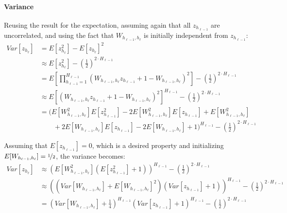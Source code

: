 \paragraph{Variance} Reusing the result for the expectation, assuming again that all $z_{h_{\ell-1}}$ are uncorrelated, and using the fact that $W_{h_{\ell-1},h_\ell}$ is initially independent from $z_{h_{\ell-1}}$:
\begin{equation}
\begin{aligned}
Var[z_{h_\ell}] &= E[z_{h_\ell}^2] - E[z_{h_\ell}]^2 \\
&\approx E[z_{h_\ell}^2] - \left(\frac{1}{2}\right)^{2 \cdot H_{\ell-1}} \\
&= E\left[\prod_{h_{\ell-1}=1}^{H_{\ell-1}}\left(W_{h_{\ell-1},h_\ell} z_{h_{\ell-1}} + 1 - W_{h_{\ell-1},h_\ell}\right)^2\right] - \left(\frac{1}{2}\right)^{2 \cdot H_{\ell-1}} \\
&\approx E[\left(W_{h_{\ell-1},h_\ell} z_{h_{\ell-1}} + 1 - W_{h_{\ell-1},h_\ell}\right)^2]^{H_{\ell-1}}- \left(\frac{1}{2}\right)^{2 \cdot H_{\ell-1}} \\
&= \Big(E[W_{h_{\ell-1},h_\ell}^2] E[z_{h_{\ell-1}}^2] - 2 E[W_{h_{\ell-1},h_\ell}^2] E[z_{h_{\ell-1}}]+ E[W_{h_{\ell-1},h_\ell}^2] \\
&\quad\quad + 2 E[W_{h_{\ell-1},h_\ell}] E[z_{h_{\ell-1}}] - 2 E[W_{h_{\ell-1},h_\ell}] + 1\Big)^{H_{\ell-1}}- \left(\frac{1}{2}\right)^{2 \cdot H_{\ell-1}}
\end{aligned}
\end{equation}

Assuming that $E[z_{h_{\ell-1}}] = 0$, which is a desired property and initializing $E[W_{h_{\ell-1},h_\ell}] = \nicefrac{1}{2}$, the variance becomes:
\begin{equation}
\begin{aligned}
Var[z_{h_\ell}] &\approx \left(E[W_{h_{\ell-1},h_\ell}^2] \left(E[z_{h_{\ell-1}}^2] + 1\right)\right)^{H_{\ell-1}}- \left(\frac{1}{2}\right)^{2 \cdot H_{\ell-1}} \\
&\approx \left(\left(Var[W_{h_{\ell-1},h_\ell}] + E[W_{h_{\ell-1},h_\ell}]^2\right) \left(Var[z_{h_{\ell-1}}] + 1\right)\right)^{H_{\ell-1}}- \left(\frac{1}{2}\right)^{2 \cdot H_{\ell-1}} \\
&= \left(Var[W_{h_{\ell-1},h_\ell}] + \frac{1}{4}\right)^{H_{\ell-1}} \left(Var[z_{h_{\ell-1}}] + 1\right)^{H_{\ell-1}} - \left(\frac{1}{2}\right)^{2 \cdot H_{\ell-1}}
\end{aligned}
\end{equation}


